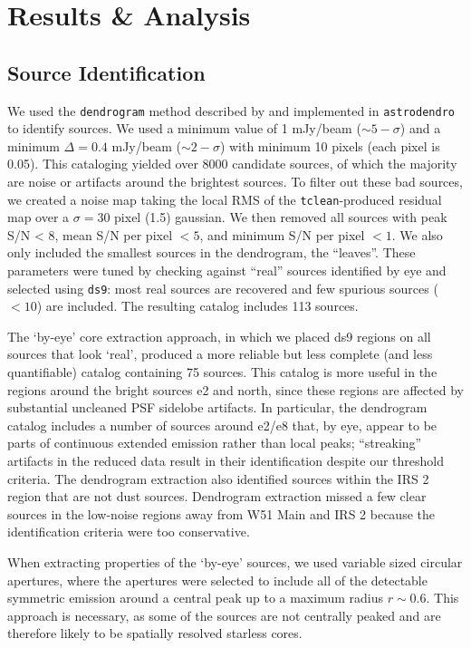 \documentclass{aa}
\begin{document}
\section{Results \& Analysis}
\subsection{Source Identification}
We used the \texttt{dendrogram} method described by \citet{Rosolowsky2008c} and
implemented in \texttt{astrodendro} to identify sources.  We used a minimum
value of 1 mJy/beam ($\sim5-\sigma$) and a minimum $\Delta=0.4$ mJy/beam
($\sim2-\sigma$) with minimum 10 pixels (each pixel is 0.05\arcsec).  This
cataloging yielded over 8000 candidate sources, of which the majority are noise
or artifacts around the brightest sources.  To filter out these bad sources,
we created a noise map taking the local RMS of the \texttt{tclean}-produced
residual map over a $\sigma=30$ pixel (1.5\arcsec) gaussian.  We then removed
all sources with peak S/N < 8, mean S/N per pixel $< 5$, and minimum S/N per
pixel $ < 1$.  We also only included the smallest sources in the dendrogram,
the ``leaves''.  These parameters were tuned by checking against ``real''
sources identified by eye and selected using \texttt{ds9}: most real sources are
recovered and few spurious sources ($<10$) are
included.  The resulting catalog includes 113 sources.

The `by-eye' core extraction approach, in which we placed ds9 regions on all
sources that look `real', produced a more reliable but less complete (and less
quantifiable) catalog containing 75 sources.  This catalog is more useful in
the regions around the bright sources e2 and north, since these regions are
affected by substantial uncleaned PSF sidelobe artifacts.  In particular, the
dendrogram catalog includes a number of sources around e2/e8 that, by eye,
appear to be parts of continuous extended emission rather than local peaks;
``streaking'' artifacts in the reduced data result in their identification
despite our threshold criteria.  The dendrogram extraction also identified
sources within the IRS 2 \hii region that are not dust sources.  Dendrogram
extraction missed a few clear sources in the low-noise regions away from
W51 Main and IRS 2 because the identification criteria were too conservative.

When extracting properties of the `by-eye' sources, we used variable sized
circular apertures, where the apertures were selected to include all of the
detectable symmetric emission around a central peak up to a maximum radius
$r\sim0.6$\arcsec.  This approach is necessary, as some of the sources are not
centrally peaked and are therefore likely to be spatially resolved starless
cores.
\end{document}
